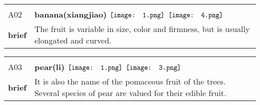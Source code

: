 \documentclass[UTF8]{article}
\begin{document}
            \begin{tabularx}{\textwidth}{p{1.5cm}X}
            \arrayrulecolor{myBlue}
        	\hline\\
            \small{A02}&
            \large{\bfseries{banana(xiangjiao)}}\hfill
                                                            $\vcenter{\hbox{\texttt{[image: 1.png]}}}$
                                                                \phantom{$\vcenter{\hbox{\texttt{[image: 2.png]}}}$}
                                                                \phantom{$\vcenter{\hbox{\texttt{[image: 3.png]}}}$}
                                                                $\vcenter{\hbox{\texttt{[image: 4.png]}}}$
                                                                \phantom{$\vcenter{\hbox{\texttt{[image: 5.png]}}}$}
                                                                \phantom{$\vcenter{\hbox{\texttt{[image: 6.png]}}}$}
                                                                \phantom{$\vcenter{\hbox{\texttt{[image: 7.png]}}}$}
                                        \\[10pt]
            \large{\bfseries{brief}}&\noindent\parbox[c]{\hsize}{The fruit is variable in size, color and firmness, but is usually elongated and curved.} \\[5pt]
            \hline\\[-10pt]
        \end{tabularx}
            \begin{tabularx}{\textwidth}{p{1.5cm}X}
            \arrayrulecolor{myBlue}
        	\hline\\
            \small{A03}&
            \large{\bfseries{pear(li)}}\hfill
                                                            $\vcenter{\hbox{\texttt{[image: 1.png]}}}$
                                                                \phantom{$\vcenter{\hbox{\texttt{[image: 2.png]}}}$}
                                                                $\vcenter{\hbox{\texttt{[image: 3.png]}}}$
                                                                \phantom{$\vcenter{\hbox{\texttt{[image: 4.png]}}}$}
                                                                \phantom{$\vcenter{\hbox{\texttt{[image: 5.png]}}}$}
                                                                \phantom{$\vcenter{\hbox{\texttt{[image: 6.png]}}}$}
                                                                \phantom{$\vcenter{\hbox{\texttt{[image: 7.png]}}}$}
                                        \\[10pt]
            \large{\bfseries{brief}}&\noindent\parbox[c]{\hsize}{It is also the name of the pomaceous fruit of the trees. Several species of pear are valued for their edible fruit.} \\[5pt]
            \hline\\[-10pt]
        \end{tabularx}
\end{document}
